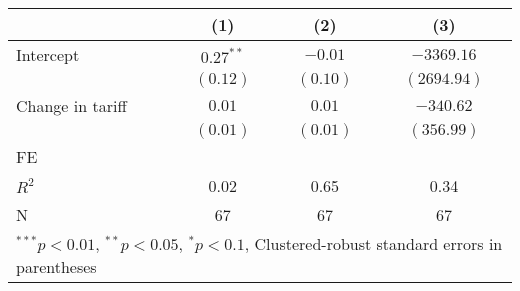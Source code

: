 
\begin{tabular}{l c c c }
\hline
 & (1) & (2) & (3) \\
\hline
Intercept & $0.27^{**}$ & $-0.01$  & $-3369.16$  \\
            & $(0.12)$    & $(0.10)$ & $(2694.94)$ \\
Change in tariff     & $0.01$      & $0.01$   & $-340.62$   \\
            & $(0.01)$    & $(0.01)$ & $(356.99)$  \\
\hline
FE          &                &                &                \\ 
\hline
$R^2$       & 0.02        & 0.65     & 0.34        \\
N           & 67          & 67       & 67          \\
\hline
\multicolumn{4}{l}{\scriptsize{$^{***}p<0.01$, $^{**}p<0.05$, $^*p<0.1$, Clustered-robust standard errors in parentheses}}
\end{tabular}

